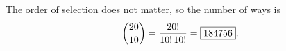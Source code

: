 The order of selection does not matter, so the number of ways is
\[\dbinom{20}{10}=\dfrac{20!}{10!\,10!}=\boxed{184756}.\]
